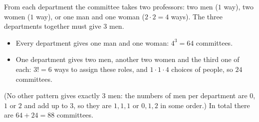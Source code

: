 From each department the committee takes two professors: two men ($1$ way), two women ($1$ way), or one man and one woman ($2\cdot2=4$ ways). The three departments together must give $3$ men.
\begin{itemize}
\item Every department gives one man and one woman: $4^3=64$ committees.
\item One department gives two men, another two women and the third one of each: $3!=6$ ways to assign these roles, and $1\cdot1\cdot4$ choices of people, so $24$ committees.
\end{itemize}
(No other pattern gives exactly $3$ men: the numbers of men per department are $0$, $1$ or $2$ and add up to $3$, so they are $1,1,1$ or $0,1,2$ in some order.) In total there are $64+24=\boxed{88}$ committees.
